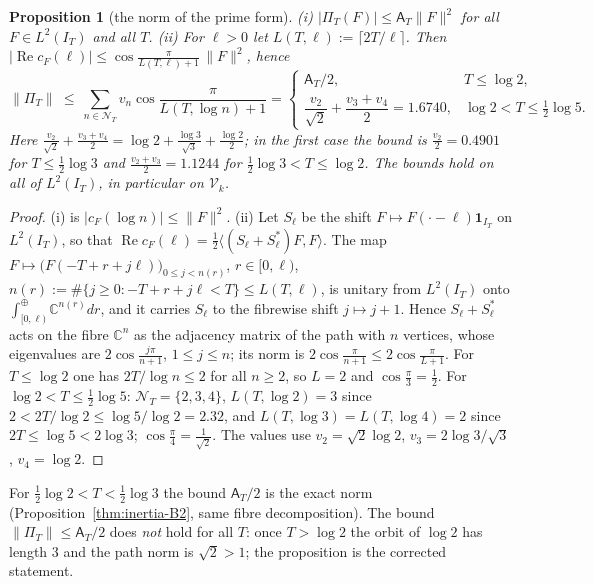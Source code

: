 \documentclass[11pt]{amsart}
\newtheorem{proposition}[theorem]{Proposition}
\theoremstyle{definition}
\theoremstyle{remark}
\newcommand{\C}{\mathbb C}
\newcommand{\Rel}{\operatorname{Re}}
\newcommand{\IT}{I_T}
\newcommand{\cF}{c_F}
\newcommand{\NT}{\mathcal N_T}
\newcommand{\Aconst}{\mathsf A_T}
\newcommand{\PiT}{\Pi_T}
\begin{document}
\begin{proposition}[the norm of the prime form]\label{prop:coer-prime}
\emph{(i)} $|\PiT(F)|\le\Aconst\|F\|^2$ for all $F\in L^2(\IT)$ and all $T$.
\emph{(ii)} For $\ell>0$ let $L(T,\ell):=\lceil2T/\ell\rceil$. Then $|\Rel\cF(\ell)|\le\cos\frac{\pi}{L(T,\ell)+1}\,\|F\|^2$,
hence
\[
\|\PiT\|\ \le\ \sum_{n\in\NT}v_n\cos\frac\pi{L(T,\log n)+1}
=\begin{cases}
\Aconst/2, & T\le\log2,\\[2pt]
\dfrac{v_2}{\sqrt2}+\dfrac{v_3+v_4}2=1.6740, & \log2<T\le\tfrac12\log5 .
\end{cases}
\]
Here $\frac{v_2}{\sqrt2}+\frac{v_3+v_4}2=\log2+\frac{\log3}{\sqrt3}+\frac{\log2}2$; in the first case the bound is
$\frac{v_2}2=0.4901$ for $T\le\frac12\log3$ and $\frac{v_2+v_3}2=1.1244$ for $\frac12\log3<T\le\log2$. The bounds hold on all of $L^2(\IT)$, in particular on $\mathcal V_k$.
\end{proposition}
\begin{proof}
(i) is $|\cF(\log n)|\le\|F\|^2$. (ii) Let $S_\ell$ be the shift $F\mapsto F(\cdot-\ell)\mathbf 1_{\IT}$ on
$L^2(\IT)$, so that $\Rel\cF(\ell)=\frac12\langle(S_\ell+S_\ell^*)F,F\rangle$. The map
$F\mapsto\big(F(-T+r+j\ell)\big)_{0\le j<n(r)}$, $r\in[0,\ell)$, $n(r):=\#\{j\ge0:-T+r+j\ell<T\}\le L(T,\ell)$, is unitary
from $L^2(\IT)$ onto $\int^\oplus_{[0,\ell)}\C^{n(r)}dr$, and it carries $S_\ell$ to the fibrewise shift $j\mapsto j+1$.
Hence $S_\ell+S_\ell^*$ acts on the fibre $\C^{n}$ as the adjacency matrix of the path with $n$ vertices, whose
eigenvalues are $2\cos\frac{j\pi}{n+1}$, $1\le j\le n$; its norm is $2\cos\frac\pi{n+1}\le2\cos\frac\pi{L+1}$. For
$T\le\log2$ one has $2T/\log n\le2$ for all $n\ge2$, so $L=2$ and $\cos\frac\pi3=\frac12$. For $\log2<T\le\frac12\log5$:
$\NT=\{2,3,4\}$, $L(T,\log2)=3$ since $2<2T/\log2\le\log5/\log2=2.32$, and $L(T,\log3)=L(T,\log4)=2$ since
$2T\le\log5<2\log3$; $\cos\frac\pi4=\frac1{\sqrt2}$. The values use $v_2=\sqrt2\log2$, $v_3=2\log3/\sqrt3$, $v_4=\log2$.
\end{proof}
For $\frac12\log2<T<\frac12\log3$ the bound $\Aconst/2$ is the exact norm (Proposition~\ref{thm:inertia-B2}, same
fibre decomposition). The bound $\|\PiT\|\le\Aconst/2$ does \emph{not} hold for all $T$: once $T>\log2$ the orbit of
$\log2$ has length $3$ and the path norm is $\sqrt2>1$; the proposition is the corrected statement.
\end{document}
